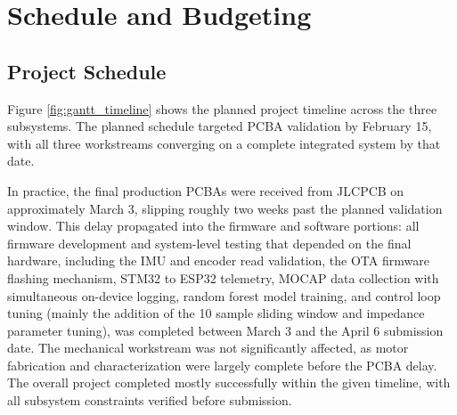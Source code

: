 \documentclass[11pt]{article}
\begin{document}
\section{Schedule and Budgeting}

\subsection{Project Schedule}

    Figure \ref{fig:gantt_timeline} shows the planned project timeline across the three subsystems. The planned schedule targeted PCBA validation by February 15, with all three workstreams converging on a complete integrated system by that date.

    In practice, the final production PCBAs were received from JLCPCB on approximately March 3, slipping roughly two weeks past the planned validation window. 
    This delay propagated into the firmware and software portions: all firmware development and system-level testing that depended on the final hardware, including the IMU and encoder read validation, the OTA firmware flashing mechanism, STM32 to ESP32 telemetry, MOCAP data collection with simultaneous on-device logging, random forest model training, and control loop tuning (mainly the addition of the 10 sample sliding window and impedance parameter tuning), 
    was completed between March 3 and the April 6 submission date. The mechanical workstream was not significantly affected, as motor fabrication and characterization were largely complete before the PCBA delay. The overall project completed mostly successfully within the given timeline, with all subsystem constraints verified before submission.
\end{document}
